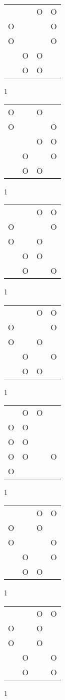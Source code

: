 \begin{tabular}{|m{0.2cm}m{0.2cm}m{0.2cm}m{0.2cm}|}\hline
 & &O&O\\
O& & &O\\
O& & &O\\
 &O&O& \\
 &O&O& \\
\hline\end{tabular}1
\begin{tabular}{|m{0.2cm}m{0.2cm}m{0.2cm}m{0.2cm}|}\hline
O& &O& \\
O& & &O\\
 & &O&O\\
 &O& &O\\
 &O&O& \\
\hline\end{tabular}1
\begin{tabular}{|m{0.2cm}m{0.2cm}m{0.2cm}m{0.2cm}|}\hline
 & &O&O\\
O& & &O\\
O& &O& \\
 &O&O& \\
 &O& &O\\
\hline\end{tabular}1
\begin{tabular}{|m{0.2cm}m{0.2cm}m{0.2cm}m{0.2cm}|}\hline
 & &O&O\\
O& & &O\\
O& &O& \\
 &O& &O\\
 &O&O& \\
\hline\end{tabular}1
\begin{tabular}{|m{0.2cm}m{0.2cm}m{0.2cm}m{0.2cm}|}\hline
 &O&O& \\
O&O& & \\
O&O& & \\
O&O& &O\\
O& & & \\
\hline\end{tabular}1
\begin{tabular}{|m{0.2cm}m{0.2cm}m{0.2cm}m{0.2cm}|}\hline
 & &O&O\\
O& &O& \\
O& & &O\\
 &O& &O\\
 &O&O& \\
\hline\end{tabular}1
\begin{tabular}{|m{0.2cm}m{0.2cm}m{0.2cm}m{0.2cm}|}\hline
 & &O&O\\
O& &O& \\
O& &O& \\
 &O& &O\\
 &O& &O\\
\hline\end{tabular}1
